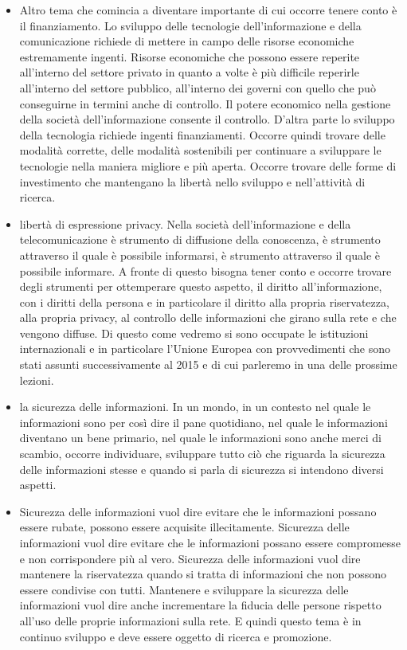 \begin{itemize}
    \item Altro tema che comincia a diventare importante di cui occorre tenere conto è il finanziamento. Lo sviluppo delle tecnologie dell'informazione e della comunicazione richiede di mettere in campo delle risorse economiche estremamente ingenti. Risorse economiche che possono essere reperite all'interno del settore privato in quanto a volte è più difficile reperirle all'interno del settore pubblico, all'interno dei governi con quello che può conseguirne in termini anche di controllo. Il potere economico nella gestione della società dell'informazione consente il controllo. D'altra parte lo sviluppo della tecnologia richiede ingenti finanziamenti. Occorre quindi trovare delle modalità corrette, delle modalità sostenibili per continuare a sviluppare le tecnologie nella maniera migliore e più aperta. Occorre trovare delle forme di investimento che mantengano la libertà nello sviluppo e nell'attività di ricerca.
    
    \item libertà di espressione privacy. Nella società dell'informazione e della telecomunicazione è strumento di diffusione della conoscenza, è strumento attraverso il quale è possibile informarsi, è strumento attraverso il quale è possibile informare. A fronte di questo bisogna tener conto e occorre trovare degli strumenti per ottemperare questo aspetto, il diritto all'informazione, con i diritti della persona e in particolare il diritto alla propria riservatezza, alla propria privacy, al controllo delle informazioni che girano sulla rete e che vengono diffuse. Di questo come vedremo si sono occupate le istituzioni internazionali e in particolare l'Unione Europea con provvedimenti che sono stati assunti successivamente al 2015 e di cui parleremo in una delle prossime lezioni.
    
    \item la sicurezza delle informazioni. In un mondo, in un contesto nel quale le informazioni sono per così dire il pane quotidiano, nel quale le informazioni diventano un bene primario, nel quale le informazioni sono anche merci di scambio, occorre individuare, sviluppare tutto ciò che riguarda la sicurezza delle informazioni stesse e quando si parla di sicurezza si intendono diversi aspetti.
    
    \item  Sicurezza delle informazioni vuol dire evitare che le informazioni possano essere rubate, possono essere acquisite illecitamente. Sicurezza delle informazioni vuol dire evitare che le informazioni possano essere compromesse e non corrispondere più al vero. Sicurezza delle informazioni vuol dire mantenere la riservatezza quando si tratta di informazioni che non possono essere condivise con tutti. Mantenere e sviluppare la sicurezza delle informazioni vuol dire anche incrementare la fiducia delle persone rispetto all'uso delle proprie informazioni sulla rete. E quindi questo tema è in continuo sviluppo e deve essere oggetto di ricerca e promozione.
\end{itemize}


